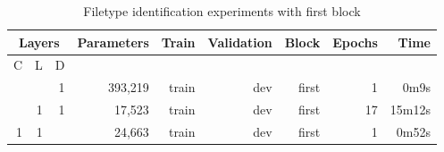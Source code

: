 \begin{table}[!ht]
    \centering
    \caption{Filetype identification experiments with first block}
    \label{tab:carving7-11}
\begin{tabular}{|r|r|r|r|r|r|r|r|r|}
\hline
\multicolumn{3}{|c|}{Layers} & Parameters & Train & Validation & Block & Epochs & Time   \\ \hline
C        & L       & D       &            &       &            &       &        &        \\ \hline
         &         & 1       & 393,219    & train & dev        & first & 1      & 0m9s   \\ \hline
         & 1       & 1       & 17,523     & train & dev        & first & 17     & 15m12s \\ \hline
1        & 1       &         & 24,663     & train & dev        & first & 1      & 0m52s  \\ \hline
\end{tabular}
\end{table}